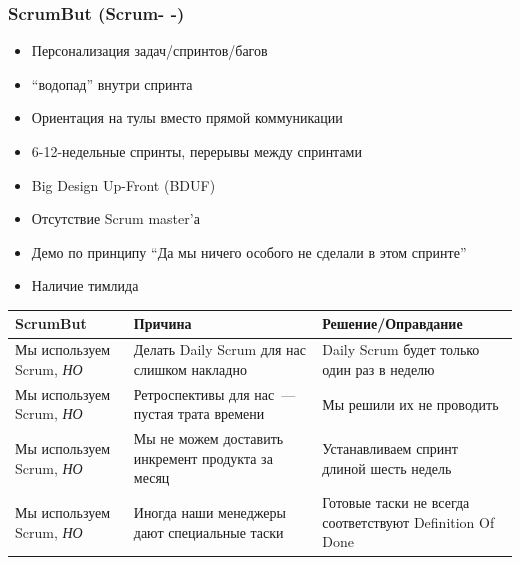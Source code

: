 \documentclass{../../slides-style}
\begin{document}
    \begin{frame}
        \frametitle{ScrumBut (Scrum- -)}
        \begin{itemize}
            \item Персонализация задач/спринтов/багов
            \item ``водопад'' внутри спринта
            \item Ориентация на тулы вместо прямой коммуникации
            \item 6-12-недельные спринты, перерывы между спринтами
            \item Big Design Up-Front (BDUF)
            \item Отсутствие Scrum master’а
            \item Демо по принципу ``Да мы ничего особого не сделали в этом спринте''
            \item Наличие тимлида
        \end{itemize}
        \begin{scriptsize}
            \begin{center}
                \begin{tabularx}{\textwidth} { 
                    | >{\centering\arraybackslash}X 
                    | >{\centering\arraybackslash}X 
                    | >{\centering\arraybackslash}X | }
                    \hline
                    ScrumBut                       & Причина                                           & Решение/Оправдание \\
                    \hline
                    Мы используем Scrum, \emph{НО} & Делать Daily Scrum для нас слишком накладно       & Daily Scrum будет только один раз в неделю               \\
                    \hline
                    Мы используем Scrum, \emph{НО} & Ретроспективы для нас~--- пустая трата времени    & Мы решили их не проводить                                \\
                    \hline
                    Мы используем Scrum, \emph{НО} & Мы не можем доставить инкремент продукта за месяц & Устанавливаем спринт длиной шесть недель                 \\
                    \hline
                    Мы используем Scrum, \emph{НО} & Иногда наши менеджеры дают специальные таски      & Готовые таски не всегда соответствуют Definition Of Done \\
                    \hline
                \end{tabularx}
            \end{center}
        \end{scriptsize}
    \end{frame}
\end{document}
